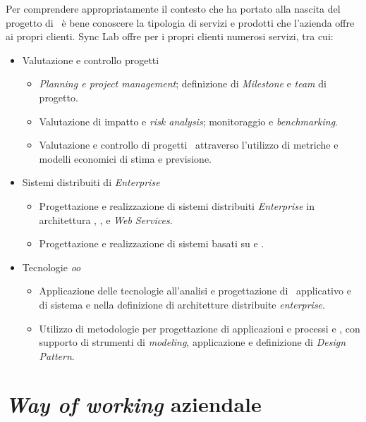 Per comprendere appropriatamente il contesto che ha portato alla nascita del progetto di \stage\, è bene conoscere la tipologia di servizi e prodotti che l'azienda offre ai propri clienti.
Sync Lab offre per i propri clienti numerosi servizi, tra cui:
\begin{itemize}
  \item Valutazione e controllo progetti
    \begin{itemize}
      \item \textit{Planning e project management}; definizione di \textit{Milestone} e \textit{team} di progetto.
      \item Valutazione di impatto e \textit{risk analysis}; monitoraggio e \textit{benchmarking}.
      \item Valutazione e controllo di progetti \software\ attraverso l’utilizzo di metriche e modelli economici di stima e previsione.
    \end{itemize}
    \item Sistemi distribuiti di \textit{Enterprise}
      \begin{itemize}
        \item Progettazione e realizzazione di sistemi distribuiti \textit{Enterprise} in architettura , ,  e \textit{Web Services}.
        \item Progettazione e realizzazione di sistemi basati su  e .
      \end{itemize}
    \item Tecnologie \textit{\acrlong{oo}}
    \begin{itemize}
      \item Applicazione delle tecnologie  all’analisi e progettazione di \software\ applicativo e di sistema e nella definizione di architetture distribuite \textit{enterprise}.
      \item Utilizzo di metodologie  per progettazione di applicazioni e processi e , con supporto di strumenti di \textit{modeling}, applicazione e definizione di \textit{Design Pattern}.
    \end{itemize}
\end{itemize}


\section{\textit{Way of working} aziendale}

